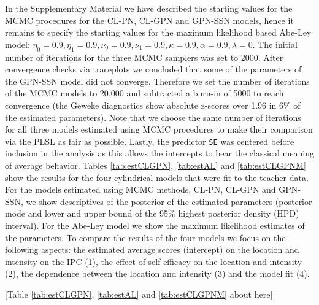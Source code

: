 \documentclass[man,mask]{apa6}
\begin{document}
In the Supplementary Material we have described the starting values for the MCMC
procedures for the CL-PN, CL-GPN and GPN-SSN models, hence it remains to specify
the starting values for the maximum likelihood based Abe-Ley model: \(\eta_0 = 0.9, \eta_1 = 0.9, \nu_0 = 0.9, \nu_1 = 0.9, \kappa = 0.9, \alpha = 0.9, \lambda = 0\). The initial number of iterations for the three MCMC samplers was set to
2000. After convergence checks via traceplots we concluded that some of the
parameters of the GPN-SSN model did not converge. Therefore we set the number of
iterations of the MCMC models to 20,000 and subtracted a burn-in of 5000 to
reach convergence (the Geweke diagnostics show absolute z-scores over 1.96 in
6\% of the estimated parameters). Note that we choose the same number of
iterations for all three models estimated using MCMC procedures to make
their comparison via the PLSL as fair as possible. Lastly, the predictor
\verb|SE| was centered before inclusion in the analysis as this allows the
intercepts to bear the classical meaning of average behavior.\newline
\indent Tables \ref{tab:estCLGPN}, \ref{tab:estAL} and \ref{tab:estCLGPNM} show
the results for the four cylindrical models that were fit to the teacher data.
For the models estimated using MCMC methods, CL-PN, CL-GPN and GPN-SSN, we show
descriptives of the posterior of the estimated parameters (posterior mode and
lower and upper bound of the 95\% highest posterior density (HPD) interval). For
the Abe-Ley model we show the maximum likelihood estimates of the parameters. To
compare the results of the four models we focus on the following aspects: the
estimated average scores (intercept) on the location and intensity on the IPC (1), the effect of self-efficacy on the location and intensity (2), the dependence between the location and intensity (3) and the model fit (4).

\hfil [Table \ref{tab:estCLGPN}, \ref{tab:estAL} and \ref{tab:estCLGPNM} about here] \hfil
\end{document}
